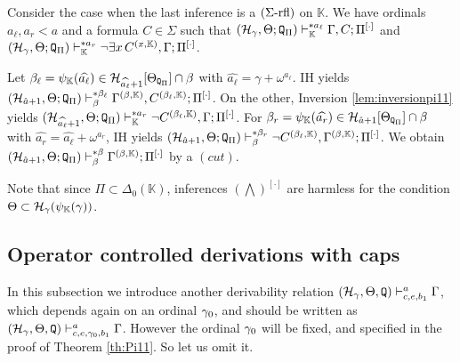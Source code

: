 \documentclass{article}
\newcommand{\mK}{\mathbb{K}}
\begin{document}
Consider the case when the last inference is a $(\Sigma\mbox{{\rm -rfl}})$ on $\mK$.
We have ordinals
$a_{\ell}, a_{r}<a$ and a formula $C\in\Sigma$ such that
$(\mathcal{H}_{\gamma},\Theta;{\tt Q}_{\Pi}
)\vdash^{* a_{\ell}}_{\mK}\Gamma,C;\Pi^{[\cdot]}$
and
$(\mathcal{H}_{\gamma},\Theta;{\tt Q}_{\Pi}
)\vdash^{* a_{r}}_{\mK}
\lnot \exists x\,C^{(x,\mK)} , \Gamma;\Pi^{[\cdot]}$.

Let $\beta_{\ell}=\psi_{\mK}(\widehat{a_{\ell}})\in\mathcal{H}_{\widehat{a_{\ell}}+1}[\Theta_{{\tt Q}_{\Pi}}]\cap\beta$ with 
$\widehat{a_{\ell}}=\gamma+\omega^{a_{\ell}}$.
IH yields
$(\mathcal{H}_{\hat{a}+1},\Theta;{\tt Q}_{\Pi}
)\vdash^{* \beta_{\ell}}_{\beta}\Gamma^{(\beta,\mK)},
C^{(\beta_{\ell},\mK)};\Pi^{[\cdot]}$.
On the other, Inversion \ref{lem:inversionpi11} yields
$(\mathcal{H}_{\widehat{a_{\ell}}+1},\Theta;{\tt Q}_{\Pi}
)\vdash^{* a_{r}}_{\mK}
\lnot C^{(\beta_{\ell},\mK)} , \Gamma;\Pi^{[\cdot]}$.
For $\beta_{r}=\psi_{\mK}(\widehat{a_{r}})\in\mathcal{H}_{\hat{a}+1}[\Theta_{{\tt Q}_{\Pi}}]\cap\beta$
with $\widehat{a_{r}}=\widehat{a_{\ell}}+\omega^{a_{r}}$, IH yields
$(\mathcal{H}_{\hat{a}+1},\Theta;{\tt Q}_{\Pi}
)\vdash^{* \beta_{r}}_{\beta}
\lnot C^{(\beta_{\ell},\mK)} , \Gamma^{(\beta,\mK)}; \Pi^{[\cdot]}$.
We obtain
$(\mathcal{H}_{\hat{a}+1},\Theta;{\tt Q}_{\Pi}
)\vdash^{* \beta}_{\beta}
\Gamma^{(\beta,\mK)};\Pi^{[\cdot]}$
by a $(cut)$.

Note that since $\Pi\subset\Delta_{0}(\mK)$, inferences $(\bigwedge)^{[\cdot]}$
are harmless for the condition
$\Theta\subset \calh_{\gam}(\psi_{\mK}(\gam))$.
\eprf












\subsection{Operator controlled derivations with caps}\label{subsec:operatorcontcap}

In this subsection we introduce
another
derivability relation $(\mathcal{H}_{\gamma},\Theta,{\tt Q})\vdash^{a}_{c,e,b_{1}} \Gamma$,
which depends again on an ordinal $\gamma_{0}$, and
should be written as $(\mathcal{H}_{\gamma},\Theta,{\tt Q})\vdash^{a}_{c,e,\gamma_{0},b_{1}} \Gamma$.
However the ordinal $\gamma_{0}$ will be fixed, and specified in the proof of Theorem \ref{th:Pi11}.
So let us omit it.
\end{document}
